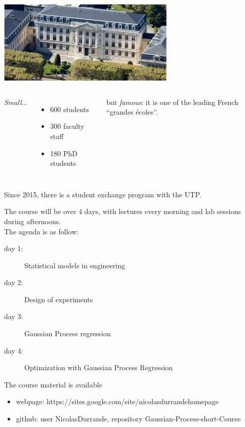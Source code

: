 \documentclass{beamer}
\begin{document}
\begin{frame}{}
\begin{center}
\includegraphics[height=4cm]{figures/Mines}
\end{center}
\begin{columns}[t]
\column{5cm}
\emph{Small}...
\begin{itemize}
	\item 600 students
	\item 300 faculty staff
	\item 180 PhD students 
\end{itemize}
\column{5cm}
but \emph{famous}: it is one of the leading French ``grandes écoles''.\\
\end{columns}
\vspace{5mm}
Since 2015, there is a student exchange program with the UTP.
\end{frame}

\begin{frame}{}
The course will be over 4 days, with lectures every morning and lab sessions during afternoons. \\ \vspace{5mm}
The agenda is as follow:
\vspace{0.2cm}
\begin{description}
	\item[day 1:] Statistical models in engineering
	\item[day 2:] Design of experiments
	\item[day 3:] Gaussian Process regression
	\item[day 4:] Optimization  with Gaussian Process Regression
\end{description}
\vspace{5mm}
The course material is available
\begin{itemize}
	\item[] webpage: \small{https://sites.google.com/site/nicolasdurrandehomepage}
	\item[] github: user NicolasDurrande, repository Gaussian-Process-short-Course
\end{itemize}

\end{frame}
\end{document}
